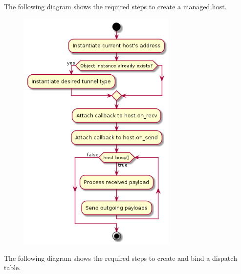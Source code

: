 \documentclass[11pt]{report}
\newcommand{\+}{\discretionary{\mbox{\scriptsize$\hookleftarrow$}}{}{}}
\begin{document}
                \newpage
                The following diagram shows the required steps to create a managed host.

                \begin{figure}[H]
                \centering
                \includegraphics[width=0.7\textwidth]{d/ac/def_manhost.png}
                \end{figure}





                \newpage
                The following diagram shows the required steps to create and bind a dispatch table.
\end{document}
